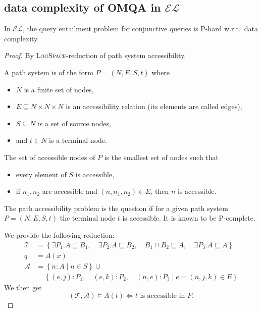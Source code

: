 \subsection{data complexity of OMQA in $\mathcal{EL}$}
\medskip
{}
\begin{prop}
	In $\mathcal{EL}$, the query entailment problem for conjunctive queries is \textsc{P}-hard w.r.t.\ data complexity.
\end{prop}
\begin{proof}
	By \textsc{LogSpace}-reduction of path system accessibility.

	A path system is of the form $P = (N, E, S, t)$ where
	\begin{itemize}
		\item $N$ is a finite set of nodes,
		\item $E \sqsubseteq N \times N \times N$ is an accessibility relation
			(its elements are called edges),
		\item $S \subseteq N$ is a set of source nodes,
		\item and $t \in N$ is a terminal node.
	\end{itemize}
	The set of accessible nodes of $P$ is the smallest set of nodes such that
	\begin{itemize}
		\item every element of $S$ is accessible,
		\item if $n_1, n_2$ are accessible and $(n, n_1, n_2) \in E$, then $n$ is accessible.
	\end{itemize}
	The path accessibility problem is the question if for a given path system $P = (N, E, S, t)$
	the terminal node $t$ is accessible.
	It is known to be \textsc{P}-complete.

	We provide the following reduction:
	\begin{align*}
		\mathcal{T} &= \left\{ \exists P_1.A \sqsubseteq B_1,\quad \exists P_2.A \sqsubseteq B_2,\quad B_1 \sqcap B_2 \sqsubseteq A,\quad \exists P_3.A \sqsubseteq A \right\}\\
		q &= A(x)\\
		\mathcal{A} &= \left\{ n:A \mid n \in S \right\} \cup \\
					&\quad\,\left\{(e,j):P_1, \quad(e,k):P_2, \quad(n,e):P_3 \mid e = (n,j,k) \in E \right\}
	\end{align*}
	We then get
	\[
		(\mathcal{T}, \mathcal{A}) \vDash A(t) \iff t \text{ is accessible in } P
	.\]


\end{proof}
